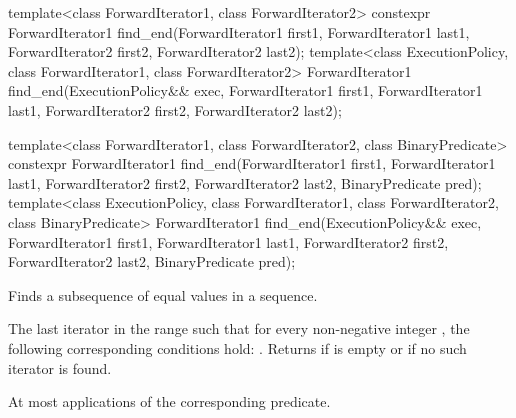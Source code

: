 %
\begin{itemdecl}
template<class ForwardIterator1, class ForwardIterator2>
  constexpr ForwardIterator1
    find_end(ForwardIterator1 first1, ForwardIterator1 last1,
             ForwardIterator2 first2, ForwardIterator2 last2);
template<class ExecutionPolicy, class ForwardIterator1, class ForwardIterator2>
  ForwardIterator1
    find_end(ExecutionPolicy&& exec,
             ForwardIterator1 first1, ForwardIterator1 last1,
             ForwardIterator2 first2, ForwardIterator2 last2);

template<class ForwardIterator1, class ForwardIterator2,
         class BinaryPredicate>
  constexpr ForwardIterator1
    find_end(ForwardIterator1 first1, ForwardIterator1 last1,
             ForwardIterator2 first2, ForwardIterator2 last2,
             BinaryPredicate pred);
template<class ExecutionPolicy, class ForwardIterator1, class ForwardIterator2,
         class BinaryPredicate>
  ForwardIterator1
    find_end(ExecutionPolicy&& exec,
             ForwardIterator1 first1, ForwardIterator1 last1,
             ForwardIterator2 first2, ForwardIterator2 last2,
             BinaryPredicate pred);
\end{itemdecl}

\begin{itemdescr}
\pnum
\effects
Finds a subsequence of equal values in a sequence.

\pnum
\returns
The last iterator
in the range 
such that for every non-negative integer
,
the following corresponding conditions hold:
.
Returns 
if
 is empty or if
no such iterator is found.

\pnum
\complexity
At most
applications of the corresponding predicate.
\end{itemdescr}

